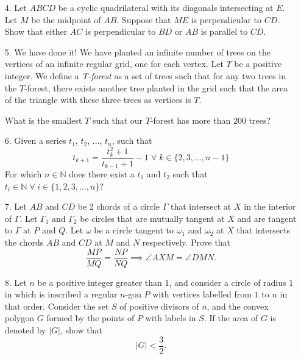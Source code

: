 \documentclass{article}
\begin{document}
\begin{enumerate}
\vspace{6pt}
\item[4.]
Let $ABCD$ be a cyclic quadrilateral with its diagonals intersecting at $E$.
Let $M$ be the midpoint of $AB$.
Suppose that $ME$ is perpendicular to $CD$.
Show that either $AC$ is perpendicular to $BD$ or $AB$ is parallel to $CD$.


\vspace{6pt}
\item[5.] %
We have done it! We have planted an infinite number of trees on the vertices of an infinite regular grid, one for each vertex. Let $T$ be a positive integer. 
We define a \textit{T-forest} as a set of trees such that for any two trees in the $T$-forest, there exists another tree planted in the grid such that the area of the triangle with these three trees as vertices is $T$.

What is the smallest $T$ such that our $T$-forest has more than $200$ trees?


\vspace{6pt}
\item[6.] %
Given a series $t_1$, $t_2$, $\dots$, $t_n$, such that 
$$t_{k + 1} = \frac{t_k^2 + 1}{t_{k - 1} + 1} - 1 \; \forall \; k \in \{2, 3, \dots, n - 1\}$$
For which $n \in \mathbb{N}$ does there exist a $t_1$ and $t_2$ such that $t_i \in \mathbb{N} \; \forall \; i \in \{1, 2, 3, \dots, n \}$?


\vspace{6pt}
\item[7.]
Let $AB$ and $CD$ be 2 chords of a circle $\Gamma$ that intersect at $X$ in the interior of $\Gamma$.
Let $\Gamma_1$ and $\Gamma_2$ be circles that are mutually tangent at $X$ and are tangent to $\Gamma$ at $P$ and $Q$.
Let $\omega$ be a circle tangent to $\omega_1$ and $\omega_2$ at $X$ that intersects the chords $AB$ and $CD$ at $M$ and $N$ respectively.
Prove that 
\[
	\frac{MP}{MQ} = \frac{NP}{NQ} \implies \angle AXM = \angle DMN.
\]

\vspace{6pt}
\item[8.] %
Let $n$ be a positive integer greater than $1$, and consider a circle of radius $1$ in which is inscribed a regular $n$-gon $P$ with vertices labelled from $1$ to $n$ in that order.
Consider the set $S$ of positive divisors of $n$, and the convex polygon $G$ formed by the points of $P$ with labels in $S$.
If the area of $G$ is denoted by $|G|$, show that
\[ 
	|G| < \frac{3}{2}.
\]

\end{enumerate}
\end{document}
